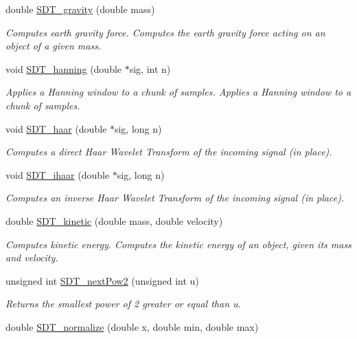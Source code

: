 \begin{DoxyCompactItemize}
double \hyperlink{group__common_ga015a2fb5c63e23e144556220011c9e54}{S\+D\+T\+\_\+gravity} (double mass)
\begin{DoxyCompactList}\small\item\em Computes earth gravity force. Computes the earth gravity force acting on an object of a given mass. \end{DoxyCompactList}\item 
void \hyperlink{group__common_gac20498f9e20eb14941b1e6f9a076e5e7}{S\+D\+T\+\_\+hanning} (double $\ast$sig, int n)
\begin{DoxyCompactList}\small\item\em Applies a Hanning window to a chunk of samples. Applies a Hanning window to a chunk of samples. \end{DoxyCompactList}\item 
void \hyperlink{group__common_gadc035ed90d7b62000e8f6467426cdb1a}{S\+D\+T\+\_\+haar} (double $\ast$sig, long n)
\begin{DoxyCompactList}\small\item\em Computes a direct Haar Wavelet Transform of the incoming signal (in place). \end{DoxyCompactList}\item 
void \hyperlink{group__common_ga1a5c0c361f29d6b5bc5612af94a33d86}{S\+D\+T\+\_\+ihaar} (double $\ast$sig, long n)
\begin{DoxyCompactList}\small\item\em Computes an inverse Haar Wavelet Transform of the incoming signal (in place). \end{DoxyCompactList}\item 
double \hyperlink{group__common_gaeb3c9a2b73924440e53d81cce514db7e}{S\+D\+T\+\_\+kinetic} (double mass, double velocity)
\begin{DoxyCompactList}\small\item\em Computes kinetic energy. Computes the kinetic energy of an object, given its mass and velocity. \end{DoxyCompactList}\item 
unsigned int \hyperlink{group__common_gac19518462fef4a36e23307b17a1ae91b}{S\+D\+T\+\_\+next\+Pow2} (unsigned int u)
\begin{DoxyCompactList}\small\item\em Returns the smallest power of 2 greater or equal than u. \end{DoxyCompactList}\item 
double \hyperlink{group__common_ga526be81b39dff106d6f7026d807b90aa}{S\+D\+T\+\_\+normalize} (double x, double min, double max)

\end{DoxyCompactItemize}
